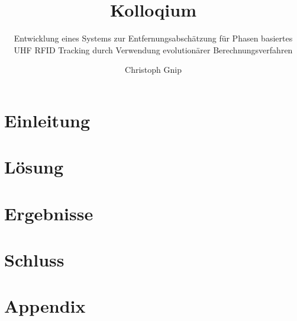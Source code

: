 \documentclass[10pt, draft]{beamer}
\title{Kolloqium}
\subtitle{Entwicklung eines Systems zur
			  Entfernungsabschätzung für
			  Phasen basiertes UHF 
			  RFID Tracking durch 
			  Verwendung evolutionärer
			  Berechnungsverfahren}
\author{Christoph Gnip}
\begin{document}
\maketitle
\frame{\tableofcontents}

\section{Einleitung}

\section{Lösung}

\section{Ergebnisse}

\section{Schluss}

%
\section{Appendix}



\end{document}
